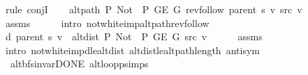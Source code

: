 \begin{isabellebody}
\isamarkupfalse%
\ {\isacharparenleft}{\kern0pt}rule\ conjI{\isacharparenright}{\kern0pt}\isanewline
\ \ \isamarkupfalse%
\ {\isachardoublequoteopen}alt{\isacharunderscore}{\kern0pt}path\ P{\isacharprime}{\kern0pt}{\isacharprime}{\kern0pt}\ {\isacharparenleft}{\kern0pt}Not\ {\isasymcirc}\ P{\isacharprime}{\kern0pt}{\isacharprime}{\kern0pt}{\isacharparenright}{\kern0pt}\ {\isacharparenleft}{\kern0pt}G{\isachardot}{\kern0pt}E\ G{\isacharparenright}{\kern0pt}\ {\isacharparenleft}{\kern0pt}rev{\isacharunderscore}{\kern0pt}follow\ {\isacharparenleft}{\kern0pt}parent\ s{\isacharparenright}{\kern0pt}\ v{\isacharparenright}{\kern0pt}\ src\ v{\isachardoublequoteclose}\isanewline
\ \ \ \ \isamarkupfalse%
\ assms\isanewline
\ \ \ \ \isamarkupfalse%
\ {\isacharparenleft}{\kern0pt}intro\ not{\isacharunderscore}{\kern0pt}white{\isacharunderscore}{\kern0pt}imp{\isacharunderscore}{\kern0pt}alt{\isacharunderscore}{\kern0pt}path{\isacharunderscore}{\kern0pt}rev{\isacharunderscore}{\kern0pt}follow{\isacharparenright}{\kern0pt}\isanewline
\ \ \isamarkupfalse%
\ {\isachardoublequoteopen}d\ {\isacharparenleft}{\kern0pt}parent\ s{\isacharparenright}{\kern0pt}\ v\ {\isacharequal}{\kern0pt}\ alt{\isacharunderscore}{\kern0pt}dist\ P{\isacharprime}{\kern0pt}{\isacharprime}{\kern0pt}\ {\isacharparenleft}{\kern0pt}Not\ {\isasymcirc}\ P{\isacharprime}{\kern0pt}{\isacharprime}{\kern0pt}{\isacharparenright}{\kern0pt}\ {\isacharparenleft}{\kern0pt}G{\isachardot}{\kern0pt}E\ G{\isacharparenright}{\kern0pt}\ src\ v{\isachardoublequoteclose}\isanewline
\ \ \ \ \isamarkupfalse%
\ assms\isanewline
\ \ \ \ \isamarkupfalse%
\ {\isacharparenleft}{\kern0pt}intro\ not{\isacharunderscore}{\kern0pt}white{\isacharunderscore}{\kern0pt}imp{\isacharunderscore}{\kern0pt}d{\isacharunderscore}{\kern0pt}le{\isacharunderscore}{\kern0pt}alt{\isacharunderscore}{\kern0pt}dist\ alt{\isacharunderscore}{\kern0pt}dist{\isacharunderscore}{\kern0pt}le{\isacharunderscore}{\kern0pt}alt{\isacharunderscore}{\kern0pt}path{\isacharunderscore}{\kern0pt}length\ antisym{\isacharparenright}{\kern0pt}\isanewline
{}\isamarkupfalse%
%
\endisatagproof
{\isafoldproof}%
%
\isadelimproof
\isanewline
%
\endisadelimproof
%
\isadeliminvisible
\isanewline
%
\endisadeliminvisible
%
\isataginvisible
{}\isamarkupfalse%
\ {\isacharparenleft}{\kern0pt}\ alt{\isacharunderscore}{\kern0pt}bfs{\isacharunderscore}{\kern0pt}invar{\isacharunderscore}{\kern0pt}DONE{\isacharparenright}{\kern0pt}\ alt{\isacharunderscore}{\kern0pt}loop{\isacharunderscore}{\kern0pt}psimps{\isacharcolon}{\kern0pt}\isanewline

\end{isabellebody}
